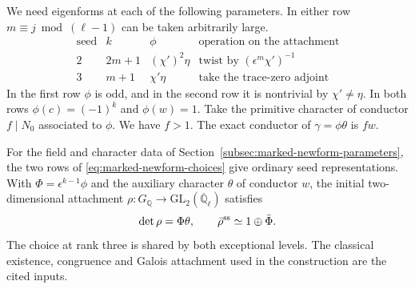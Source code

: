 We need eigenforms at each of the following parameters. In either
row \(m\equiv j\bmod(\ell-1)\) can be taken arbitrarily large.
\begin{equation}\label{eq:marked-newform-choices}
\begin{array}{c|c|c|c}
\text{seed}&k&\phi&\text{operation on the attachment}\\ \hline
2&2m+1&(\chi')^2\eta&\text{twist by }(\epsilon^m\chi')^{-1}\\
3&m+1&\chi'\eta&\text{take the trace-zero adjoint}
\end{array}
\end{equation}
In the first row \(\phi\) is odd, and in the second row it is
nontrivial by \(\chi'\ne\eta\). In both rows
\(\phi(c)=(-1)^k\) and \(\phi(w)=1\). Take the primitive character
of conductor \(f\mid N_0\) associated to \(\phi\). We have \(f>1\).
The exact conductor of \(\gamma=\phi\theta\) is \(fw\).

\begin{lemma}
\label{lem:ordinary-newform-seeds}
For the field and character data of
Section~\ref{subsec:marked-newform-parameters}, the two rows of
\eqref{eq:marked-newform-choices} give ordinary seed representations. With
\(\Phi=\epsilon^{k-1}\phi\) and the auxiliary character \(\theta\) of
conductor \(w\), the initial two-dimensional attachment
\(\rho:G_{\mathbb Q}\to\mathrm{GL}_2(\overline{\mathbb Q}_\ell)\) satisfies
\[
       \det\rho=\Phi\theta,\qquad
       \bar\rho^{\rm ss}\simeq 1\oplus\bar\Phi.
\] The
choice at rank three is shared by both exceptional levels.
The classical existence, congruence and Galois attachment used
in the construction are the cited inputs.
\end{lemma}

